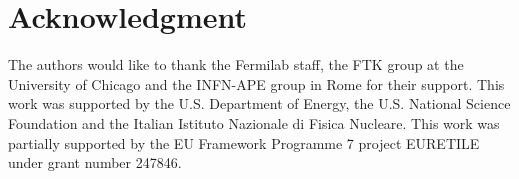 \documentclass[journal]{IEEEtran}
\begin{document}
%

\section*{Acknowledgment}
The authors would like to thank the Fermilab staff,  the FTK group at the 
University of Chicago and the INFN-APE group in Rome for their support. This work was supported by the
U.S. Department of Energy, the U.S. National Science Foundation and the Italian
Istituto Nazionale di Fisica Nucleare. This work was partially supported by the 
EU Framework Programme 7 project EURETILE under grant number 247846. 




\end{document}
